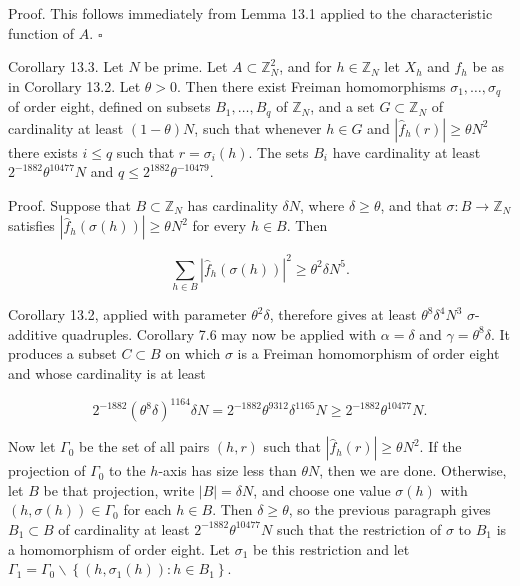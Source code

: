 \documentclass[10pt]{article}
\begin{document}
Proof. This follows immediately from Lemma 13.1 applied to the characteristic function of $A$. \(\square\)

Corollary 13.3. Let $N$ be prime. Let $A \subset \mathbb{Z}_{N}^{2}$, and for $h \in \mathbb{Z}_{N}$ let $X_{h}$ and $f_{h}$ be as in Corollary 13.2. Let $\theta>0$. Then there exist Freiman homomorphisms $\sigma_{1}, \ldots, \sigma_{q}$ of order eight, defined on subsets $B_{1}, \ldots, B_{q}$ of $\mathbb{Z}_{N}$, and a set $G \subset \mathbb{Z}_{N}$ of cardinality at least $(1-\theta) N$, such that whenever $h \in G$ and $\left|\hat{f}_{h}(r)\right| \geqslant \theta N^{2}$ there exists $i \leqslant q$ such that $r=\sigma_{i}(h)$. The sets $B_{i}$ have cardinality at least $2^{-1882} \theta^{10477} N$ and $q \leqslant 2^{1882} \theta^{-10479}$.

Proof. Suppose that $B \subset \mathbb{Z}_{N}$ has cardinality $\delta N$,
where $\delta\geqslant\theta$, and that
$\sigma: B \rightarrow \mathbb{Z}_{N}$ satisfies
$\left|\hat{f}_{h}(\sigma(h))\right| \geqslant \theta N^{2}$ for every
$h \in B$. Then

$$
\sum_{h \in B}\left|\hat{f}_{h}(\sigma(h))\right|^{2}
  \geqslant \theta^{2}\delta N^{5}.
$$

Corollary 13.2, applied with parameter $\theta^{2}\delta$, therefore gives
at least $\theta^{8}\delta^{4}N^{3}$ $\sigma$-additive quadruples.
Corollary 7.6 may now be applied with
$\alpha=\delta$ and $\gamma=\theta^{8}\delta$.  It produces a subset
$C\subset B$ on which $\sigma$ is a Freiman homomorphism of order eight and
whose cardinality is at least

$$
2^{-1882}(\theta^{8}\delta)^{1164}\delta N
  =2^{-1882}\theta^{9312}\delta^{1165}N
  \geqslant 2^{-1882}\theta^{10477}N.
$$

Now let $\Gamma_{0}$ be the set of all pairs $(h, r)$ such that $\left|\hat{f}_{h}(r)\right| \geqslant \theta N^{2}$. If the projection of $\Gamma_0$ to the $h$-axis has size less than $\theta N$, then we are done. Otherwise, let $B$ be that projection, write $|B|=\delta N$, and choose one value $\sigma(h)$ with $(h,\sigma(h))\in\Gamma_0$ for each $h\in B$. Then $\delta\geqslant\theta$, so the previous paragraph gives $B_{1} \subset B$ of cardinality at least $2^{-1882} \theta^{10477} N$ such that the restriction of $\sigma$ to $B_{1}$ is a homomorphism of order eight. Let $\sigma_{1}$ be this restriction and let $\Gamma_{1}=\Gamma_0 \backslash\left\{\left(h, \sigma_{1}(h)\right): h \in B_{1}\right\}$.
\end{document}

